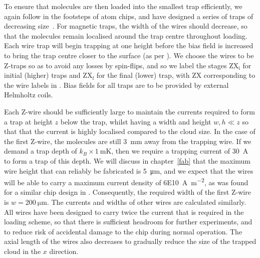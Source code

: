 To ensure that molecules are then loaded into the smallest trap efficiently, we
again follow in the footsteps of atom chips, and have designed  a series of
traps of decreasing size~\cite{Reichel1999}. For magnetic traps, the width of
the wires should decrease, so that the molecules remain localised around the
trap centre throughout loading. 
%
Each wire trap will begin trapping at one height before the bias field is
increased to bring the trap centre closer to the surface (as per
). We choose the wires to be Z-traps so as to avoid
any losses by spin-flips, and so we label the stages $\mathrm{ZX_i}$ for
initial (higher) traps and $\mathrm{ZX_f}$ for the final (lower) trap, with
$\mathrm{ZX}$ corresponding to the wire labels in
. Bias fields for all traps are to be provided
by external Helmholtz coils.

Each Z-wire should be sufficiently large to maintain the currents required to
form a trap at height $z$ below the trap, whilst having a width and height  $w,
h \ll z$ so that that the current is highly localised compared to the cloud
size.
%
In the case of the first Z-wire, the molecules are still \SI{3}{\milli\meter}
away from the trapping wire. If we demand a trap depth of
$k_B\times\SI{1}{\milli\kelvin}$, then we require a trapping current of
\SI{30}{\ampere} to form a trap of this depth.  We will discuss in
chapter~\ref{fab} that the maximum wire height that can reliably be fabricated
is \SI{5}{\micro\meter}, and we expect that the wires will be able to carry a
maximum current density of \SI{6E10}{\ampere\per\meter\squared}, as was found
for a similar chip design in . Consequently, the
required width of the first Z-wire is $w=\SI{200}{\micro\meter}$. The currents
and widths of other wires are calculated similarly.
%
All wires have been designed to
carry twice the current that is required in the loading scheme, so that there
is sufficient headroom for further experiments, and to reduce risk of
accidental damage to the chip during normal operation.
%
The axial length of the wires also decreases to gradually reduce the size of
the trapped cloud in the $x$ direction.  

